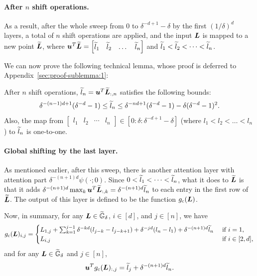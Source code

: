 \paragraph{After $n$ shift operations.}
As a result, after the whole sweep from $0$ to $\delta^{-d+1}-\delta$ by the first $(1/\delta)^d$ layers, a total of $n$ shift operations are applied, and the input ${\bm{L}}$ is mapped to a new point $\widetilde{{\bm{L}}}$, where ${\bm{u}}^T \widetilde{{\bm{L}}} = \begin{bmatrix}\widetilde{l}_1 & \widetilde{l}_2 & \dots & \widetilde{l}_n \end{bmatrix}$ and $\widetilde{l}_1 < \widetilde{l}_2 < \dots < \widetilde{l}_n$.

We can now prove the following technical lemma, whose proof is deferred to Appendix~\ref{sec:proof-sublemma:1}:
\begin{lemma}
\label{sublemma:1}
After $n$ shift operations, $\widetilde{l}_n = {\bm{u}}^T \widetilde{{\bm{L}}}_{:,n}$ satisfies the following bounds:
\begin{equation*}
    \delta^{-(n-1)d+1}(\delta^{-d} - 1) 
    \leq \widetilde{l}_n 
    \leq \delta^{-nd + 1}(\delta^{-d}-1) - \delta (\delta^{-d} - 1)^2.
\end{equation*}
Also, the map from $\begin{bmatrix} l_1 & l_2 & \cdots & l_n \end{bmatrix} \in [0:\delta:\delta^{-d+1}-\delta]$ (where $l_1 < l_2 < \dots < l_n$) to $\widetilde{l}_n$ is one-to-one.
\end{lemma}

\paragraph{Global shifting by the last layer.}
As mentioned earlier, after this sweep, there is another attention layer with attention part $\delta^{-(n+1)d} \psi(\cdot;0)$.
Since $0<\widetilde{l}_1 < \cdots < \widetilde{l}_n$, what it does to $\widetilde{{\bm{L}}}$ is that it adds $\delta^{-(n+1)d} \max_k {\bm{u}}^T \widetilde{{\bm{L}}}_{:,k} = \delta^{-(n+1)d} \widetilde{l}_n$ to each entry in the first row of $\widetilde{{\bm{L}}}$. The output of this layer is defined to be the function $g_{\rm c}({\bm{L}})$.

Now, in summary, for any ${\bm{L}} \in \widetilde{{\mathbb{G}}}_{\delta}$, $i \in [d]$, and $j \in [n]$, we have
\begin{equation*}
    g_{\rm c}({\bm{L}})_{i,j} = 
    \begin{cases}
        {L}_{1,j} + \sum_{k=1}^{j-1} \delta^{-kd}(l_{j-k}-l_{j-k+1}) + \delta^{-jd} (l_n-l_1) + \delta^{-(n+1)d} \widetilde{l}_n & \text { if } i = 1,\\
        {L}_{i,j} & \text { if } i \in [2,d],
    \end{cases}
\end{equation*}
and for any ${\bm{L}} \in \widetilde{{\mathbb{G}}}_{\delta}$ and $j \in [n]$,
\begin{equation*}
    {\bm{u}}^T g_{\rm c}({\bm{L}})_{:,j} = \widetilde{l}_{j} + \delta^{-(n+1)d} \widetilde{l}_n.
\end{equation*}

